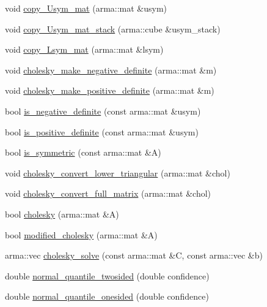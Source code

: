 \begin{DoxyCompactItemize}
\item 
void \hyperlink{namespacemappel_a7332bb151bb9ea23be4af80743009954}{copy\+\_\+\+Usym\+\_\+mat} (arma\+::mat \&usym)
\item 
void \hyperlink{namespacemappel_adc3bf0a587ba342027b52ba7075e72cc}{copy\+\_\+\+Usym\+\_\+mat\+\_\+stack} (arma\+::cube \&usym\+\_\+stack)
\item 
void \hyperlink{namespacemappel_a32086cdd1ef53eaff6ed9449d9fd8c1a}{copy\+\_\+\+Lsym\+\_\+mat} (arma\+::mat \&lsym)
\item 
void \hyperlink{namespacemappel_af0d85d0ac01f8397a555efb5912fc2ea}{cholesky\+\_\+make\+\_\+negative\+\_\+definite} (arma\+::mat \&m)
\item 
void \hyperlink{namespacemappel_af22fb1e606ca14f8b46ffde3b8833a9f}{cholesky\+\_\+make\+\_\+positive\+\_\+definite} (arma\+::mat \&m)
\item 
bool \hyperlink{namespacemappel_ad631839d6d2c62198d21364ca379f529}{is\+\_\+negative\+\_\+definite} (const arma\+::mat \&usym)
\item 
bool \hyperlink{namespacemappel_a3ffbe5273f0e95ef18a3bc26bc207489}{is\+\_\+positive\+\_\+definite} (const arma\+::mat \&usym)
\item 
bool \hyperlink{namespacemappel_ac4b4d6a93b8b227b0a845693ba842e61}{is\+\_\+symmetric} (const arma\+::mat \&A)
\item 
void \hyperlink{namespacemappel_ab5ab3a874402fccd700e6c7afbbd3e15}{cholesky\+\_\+convert\+\_\+lower\+\_\+triangular} (arma\+::mat \&chol)
\item 
void \hyperlink{namespacemappel_a2f4256e721d1f22f2d72817ba3d2540d}{cholesky\+\_\+convert\+\_\+full\+\_\+matrix} (arma\+::mat \&chol)
\item 
bool \hyperlink{namespacemappel_abc3956f093388acda04ee4455d01b515}{cholesky} (arma\+::mat \&A)
\item 
bool \hyperlink{namespacemappel_a5b0ad6d46ef0173ae9e44a0ff9af7f0b}{modified\+\_\+cholesky} (arma\+::mat \&A)
\item 
arma\+::vec \hyperlink{namespacemappel_a83b18a0a288ca81106d44e26d830d6d5}{cholesky\+\_\+solve} (const arma\+::mat \&C, const arma\+::vec \&b)
\item 
double \hyperlink{namespacemappel_a69b8109164dc63d76f99ad0d9c149148}{normal\+\_\+quantile\+\_\+twosided} (double confidence)
\item 
double \hyperlink{namespacemappel_a7cf2f920819c8899c4f01d25072412db}{normal\+\_\+quantile\+\_\+onesided} (double confidence)
\item 

\end{DoxyCompactItemize}

